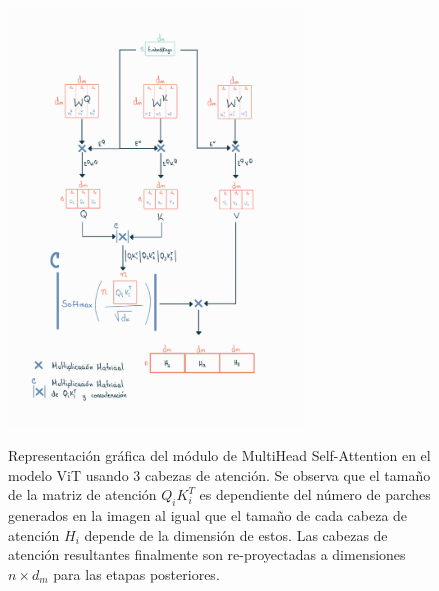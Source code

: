 \begin{figure}[htp]
    \centering
    {\includegraphics[width=0.7\textwidth]{Chapters/4. ViT-Lung/images/cabezas_vit.jpg}}
\caption{Representación gráfica del módulo de MultiHead Self-Attention en el modelo ViT usando 3 cabezas
         de atención. Se observa
         que el tamaño de la matriz de atención $Q_i K_i^T$ es dependiente del número de parches
         generados en la imagen al igual que el tamaño de cada cabeza de atención $H_i$ depende de
         la dimensión de estos. Las cabezas de atención resultantes finalmente son re-proyectadas
         a dimensiones $n \times d_m$ para las etapas posteriores. }
\label{vit-head-dim}
\end{figure}




